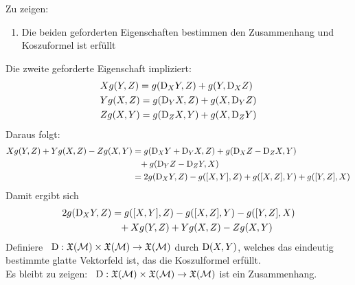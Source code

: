 
\begin{bew}
Zu zeigen:
\begin{enumerate}
\item Die beiden geforderten Eigenschaften bestimmen den Zusammenhang und Koszuformel ist erfüllt
\end{enumerate}
Die zweite geforderte Eigenschaft impliziert:
\begin{align*}
&X g(Y, Z) = g(\mathrm{D}_X Y, Z) + g(Y, \mathrm{D}_X Z)\\
&Y g(X , Z) = g (\mathrm{D}_Y X, Z) + g(X, \mathrm{D}_Y Z)\\
&Z g(X, Y) = g(\mathrm{D}_Z X, Y) + g(X, \mathrm{D}_Z Y)
\end{align*}
Daraus folgt:
\begin{align*}
X g(Y, Z) + Y g(X , Z) - Z g(X, Y) &= g(\covd_X Y + \covd_Y X, Z) + g(\covd_X Z - \covd_Z X , Y)\\
 & \phantom{=}+ g(\covd_Y Z - \covd_Z Y, X) \\
 &= 2 g(\covd_X Y, Z) - g(\comm{X}{Y}, Z) + g(\comm{X}{Z}, Y) + g(\comm{Y}{Z}, X)
\end{align*}
Damit ergibt sich
\begin{align}
2 g(\covd_X Y, Z) &= g(\comm{X}{Y}, Z) - g(\comm{X}{Z}, Y) - g(\comm{Y}{Z}, X)\\
&\phantom{=} + X g(Y, Z) + Y g(X, Z) - Z g(X, Y)
\end{align}
Definiere  \ $\mathrm{D} : \mathfrak{X}(\mathcal{M}) \times \mathfrak{X}(\mathcal{M}) \to \mathfrak{X}(\mathcal{M})$
durch $\mathrm{D} (X, Y)$, welches das eindeutig bestimmte glatte Vektorfeld ist, das die Koszulformel erfüllt.\\
Es bleibt zu zeigen: \
$\mathrm{D} : \mathfrak{X}(\mathcal{M}) \times \mathfrak{X}(\mathcal{M}) \to \mathfrak{X}(\mathcal{M}) $ ist ein Zusammenhang.


\end{bew}
